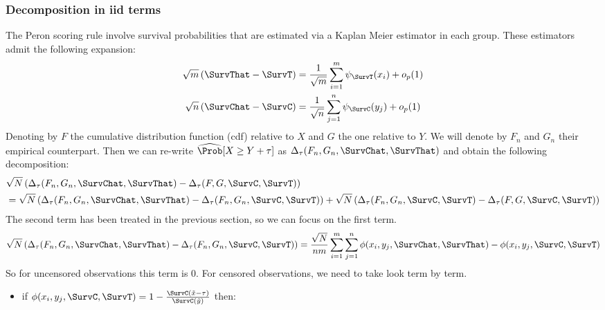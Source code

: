 \documentclass[12pt]{article}
\newcommand\xobs{\tilde{x}}
\newcommand\yobs{\tilde{y}}
\begin{document}
\subsubsection{Decomposition in iid terms}
\label{sec:org98273ee}

The Peron scoring rule involve survival probabilities that are
estimated via a Kaplan Meier estimator in each group. These estimators
admit the following expansion:
\begin{align*}
\sqrt{m}\left( \SurvThat - \SurvT \right) &= \frac{1}{\sqrt{m}} \sum_{i=1}^m \psi_{\SurvT}(x_i) + o_p(1)  \\
\sqrt{n}\left( \SurvChat - \SurvC \right) &= \frac{1}{\sqrt{n}} \sum_{j=1}^n \psi_{\SurvC}(y_j) + o_p(1)
\end{align*}
Denoting by \(F\) the cumulative distribution function (cdf) relative
to \(X\) and \(G\) the one relative to \(Y\). We will denote by
\(F_n\) and \(G_n\) their empirical counterpart. Then we can re-write
\(\widehat{\Prob}[X \geq Y+\tau]\) as
\(\Delta_{\tau}(F_n,G_n,\SurvChat,\SurvThat)\) and obtain the
following decomposition:
\begin{align*}
&\sqrt{N}\left(\Delta_{\tau}(F_n,G_n,\SurvChat,\SurvThat)-\Delta_{\tau}(F,G,\SurvC,\SurvT) \right) \\
&=  \sqrt{N}\left(\Delta_{\tau}(F_n,G_n,\SurvChat,\SurvThat)-\Delta_{\tau}(F_n,G_n,\SurvC,\SurvT) \right)
+  \sqrt{N}\left(\Delta_{\tau}(F_n,G_n,\SurvC,\SurvT)-\Delta_{\tau}(F,G,\SurvC,\SurvT) \right)
\end{align*}
The second term has been treated in the previous section, so we can focus on the first term. 
\begin{align*}
\sqrt{N}\left(\Delta_{\tau}(F_n,G_n,\SurvChat,\SurvThat)-\Delta_{\tau}(F_n,G_n,\SurvC,\SurvT) \right)
&= \frac{\sqrt{N}}{nm} \sum_{i=1}^m \sum_{j=1}^n \phi(x_i,y_j,\SurvChat,\SurvThat) - \phi(x_i,y_j,\SurvC,\SurvT) \\
\end{align*}
So for uncensored observations this term is 0. For censored
observations, we need to take look term by term.
\begin{itemize}
\item if \(\phi(x_i,y_j,\SurvC,\SurvT) = 1-\frac{\SurvC(\xobs-\tau)}{\SurvC(\yobs)}\) then:
\end{itemize}
\end{document}
